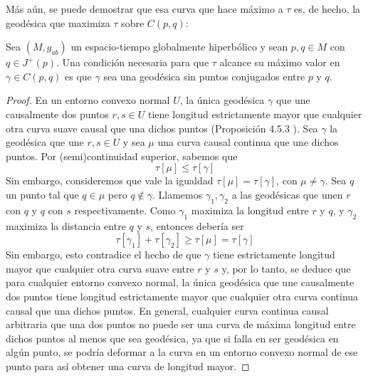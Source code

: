 Más aún, se puede demostrar que esa curva que hace máximo a $\tau$ es, de hecho, la geodésica que maximiza $\tau$ sobre $C(p,q)$:


\begin{theorem}
Sea $(M,g_{ab})$ un espacio-tiempo globalmente hiperbólico y sean $p,q\in M$ con $q\in J^+(p)$. Una condición necesaria para que $\tau$ alcance su máximo valor en $\gamma\in C(p,q)$ es que $\gamma$ sea una geodésica sin puntos conjugados entre $p$ y $q$.
\end{theorem}
\begin{proof}
En un entorno convexo normal $U$, la única geodésica $\gamma$ que une causalmente dos puntos $r,s\in U$ tiene longitud estrictamente mayor que cualquier otra curva suave causal que una dichos puntos (Proposición 4.5.3 \citep{1984ucp..book.....W}). Sea $\gamma$ la geodésica que une $r,s\in U$ y sea $\mu$ una curva causal continua que une dichos puntos. Por (semi)continuidad superior, sabemos que 
$$
\tau[\mu]\leq\tau[\gamma]
$$
Sin embargo, consideremos que vale la igualdad $\tau[\mu]=\tau[\gamma]$, con $\mu\neq\gamma$. Sea $q$ un punto tal que $q\in \mu$ pero $q\notin \gamma$. Llamemos $\gamma_1,\gamma_2$ a las geodésicas que unen $r$ con $q$ y $q$ con $s$ respectivamente. Como $\gamma_1$ maximiza la longitud entre $r$ y $q$, y $\gamma_2$ maximiza la distancia entre $q$ y $s$, entonces debería ser
$$
\tau[\gamma_1]+\tau[\gamma_2]\geq\tau[\mu]=\tau[\gamma]
$$
Sin embargo, esto contradice el hecho de que $\gamma$ tiene estrictamente longitud mayor que cualquier otra curva suave entre $r$ y $s$ y, por lo tanto, se deduce que para cualquier entorno convexo normal, la única geodésica que une causalmente dos puntos tiene longitud estrictamente mayor que cualquier otra curva continua causal que una dichos puntos. En general, cualquier curva continua causal arbitraria que una dos puntos no puede ser una curva de máxima longitud entre dichos puntos al menos que sea geodésica, ya que si falla en ser geodésica en algún punto, se podría deformar a la curva en un entorno convexo normal de ese punto para así obtener una curva de longitud mayor.
\end{proof}



